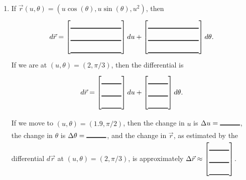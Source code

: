 \begin{problem}
\begin{enumerate}
\item If $\vec r(u,\theta)=(u\cos(\theta), u\sin(\theta), u^2)$, then 
$$d\vec r = \begin{bmatrix}\blank{1in}\\\blank{1in}\\\blank{1in}\end{bmatrix}du +  \begin{bmatrix}\blank{1in}\\\blank{1in}\\\blank{1in}\end{bmatrix}d\theta.$$
If we are at $(u,\theta)=(2,\pi/3)$, then the differential is $$d\vec r = \begin{bmatrix}\blank{1cm}\\\blank{1cm}\\\blank{1cm}\end{bmatrix}du +  \begin{bmatrix}\blank{1cm}\\\blank{1cm}\\\blank{1cm}\end{bmatrix}d\theta.$$
If we move to $(u,\theta)=(1.9, \pi/2)$, then the change in $u$ is $\Delta u=\blank{1cm}$, the change in $\theta$ is $\Delta \theta=\blank{1cm}$, and the change in $\vec r$, as estimated by the differential $d\vec r$ at $(u,\theta)=(2,\pi/3)$, is approximately $\Delta \vec r\approx \begin{bmatrix}\blank{1cm}\\\blank{1cm}\\\blank{1cm}\end{bmatrix}$.
  \end{enumerate}

\end{problem}

